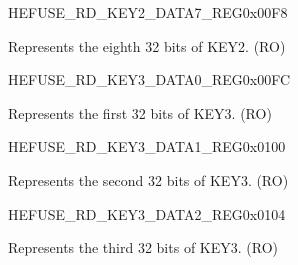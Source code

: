 \begin{register}{H}{EFUSE\_RD\_KEY2\_DATA7\_REG}{0x{}00F8}\label{regdesc:EFUSERDKEY2DATA7REG}
%
\regnewline%
\begin{regdesc}\begin{reglist}
\label{fielddesc:EFUSEKEY2DATA7}\item [EFUSE\_KEY2\_DATA7] Represents the eighth 32 bits of KEY2. (RO)
\end{reglist}\end{regdesc}
\end{register}


\begin{register}{H}{EFUSE\_RD\_KEY3\_DATA0\_REG}{0x{}00FC}\label{regdesc:EFUSERDKEY3DATA0REG}
%
\regnewline%
\begin{regdesc}\begin{reglist}
\label{fielddesc:EFUSEKEY3DATA0}\item [EFUSE\_KEY3\_DATA0] Represents the first 32 bits of KEY3. (RO)
\end{reglist}\end{regdesc}
\end{register}


\begin{register}{H}{EFUSE\_RD\_KEY3\_DATA1\_REG}{0x{}0100}\label{regdesc:EFUSERDKEY3DATA1REG}
%
\regnewline%
\begin{regdesc}\begin{reglist}
\label{fielddesc:EFUSEKEY3DATA1}\item [EFUSE\_KEY3\_DATA1] Represents the second 32 bits of KEY3. (RO)
\end{reglist}\end{regdesc}
\end{register}


\begin{register}{H}{EFUSE\_RD\_KEY3\_DATA2\_REG}{0x{}0104}\label{regdesc:EFUSERDKEY3DATA2REG}
%
\regnewline%
\begin{regdesc}\begin{reglist}
\label{fielddesc:EFUSEKEY3DATA2}\item [EFUSE\_KEY3\_DATA2] Represents the third 32 bits of KEY3. (RO)
\end{reglist}\end{regdesc}
\end{register}


